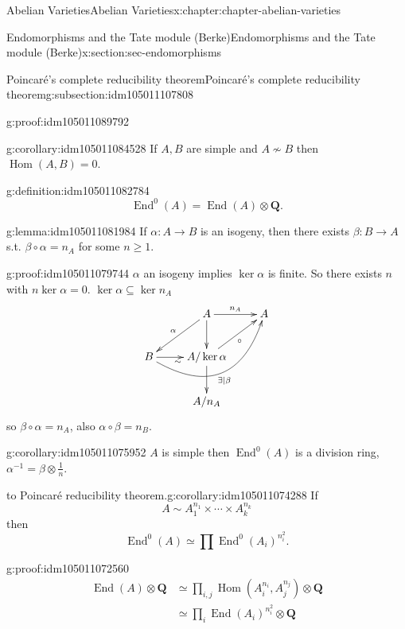 \documentclass[oneside,10pt,]{book}
\numberwithin{equation}{section}
\newcommand{\QQ}{\mathbf{Q}}
\DeclareMathOperator{\End}{End}
\DeclareMathOperator{\Hom}{Hom}
\newcommand{\amp}{&}
\begin{document}
\begin{chapterptx}{Abelian Varieties}{}{Abelian Varieties}{}{}{x:chapter:chapter-abelian-varieties}
\begin{sectionptx}{Endomorphisms and the Tate module (Berke)}{}{Endomorphisms and the Tate module (Berke)}{}{}{x:section:sec-endomorphisms}
\begin{subsectionptx}{Poincaré's complete reducibility theorem}{}{Poincaré's complete reducibility theorem}{}{}{g:subsection:idm105011107808}
\begin{proofptx}{}{g:proof:idm105011089792}
\end{proofptx}
\begin{corollary}{}{}{g:corollary:idm105011084528}%
If \(A,B\) are simple and  \(A\not\sim B\) then \(\Hom(A,B) = 0\).%
\end{corollary}
\begin{definition}{}{g:definition:idm105011082784}%
%
\begin{equation*}
\End^0(A) = \End(A) \otimes \QQ\text{.}
\end{equation*}
%
\end{definition}
\begin{lemma}{}{}{g:lemma:idm105011081984}%
If \(\alpha \colon A\to B\) is an isogeny, then there exists \(\beta \colon B\to A\) s.t. \(\beta \circ \alpha = n_A\) for some \(n \ge 1\).%
\end{lemma}
\begin{proofptx}{}{g:proof:idm105011079744}
\(\alpha\) an isogeny implies \(\ker \alpha\) is finite. So there exists \(n\) with \(n \ker \alpha = 0\). \(\ker\alpha \subseteq \ker n_A\)%
\begin{equation*}
\xymatrix{
& A \ar[dl]_\alpha \ar[d]\ar[r]^{n_A} & A \\
B\ar[r]_\sim \ar@/_3.0pc/[urr]_{\exists | \beta} & A/\ker\alpha \ar[d]\ar[ur]_{\circ} &\\
& A/n_A &
}
\end{equation*}
so \(\beta\circ \alpha = n_A\), also \(\alpha \circ \beta = n_B\).%
\end{proofptx}
\begin{corollary}{}{}{g:corollary:idm105011075952}%
\(A\) is simple then \(\End^0(A)\) is a division ring, \(\alpha^{-1} = \beta \otimes \frac 1n\).%
\end{corollary}
\begin{corollary}{to Poincaré reducibility theorem.}{}{g:corollary:idm105011074288}%
If%
\begin{equation*}
A\sim A_1^{n_1} \times \cdots \times A_k^{n_k}
\end{equation*}
then%
\begin{equation*}
\End^0(A) \simeq \prod \End^0(A_i)^{n_i^2}\text{.}
\end{equation*}
%
\end{corollary}
\begin{proofptx}{}{g:proof:idm105011072560}
%
\begin{align*}
\End(A) \otimes \QQ \amp \simeq \prod_{i,j} \Hom(A_i^{n_i}, A_j^{n_j}) \otimes \QQ\\
\amp \simeq \prod_{i} \End(A_i)^{n_i^2} \otimes \QQ\\

\end{align*}
\end{proofptx}
\end{subsectionptx}
\end{sectionptx}
\end{chapterptx}
\end{document}
